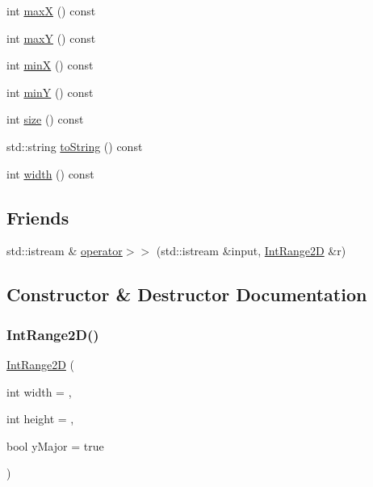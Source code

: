 \begin{DoxyCompactItemize}
\item 
int \mbox{\hyperlink{classIntRange2D_aa9493e60175cb4e130ae4cfba2b55907}{maxX}} () const
\item 
int \mbox{\hyperlink{classIntRange2D_a015dcf4989cbafff40d5a345b9d9f959}{maxY}} () const
\item 
int \mbox{\hyperlink{classIntRange2D_a1a1724b4b31e3d3d251e5816c7d9e448}{minX}} () const
\item 
int \mbox{\hyperlink{classIntRange2D_a2337641dec44ff553785d9c143c3aafd}{minY}} () const
\item 
int \mbox{\hyperlink{classIntRange2D_af9593d4a5ff4274efaf429cb4f9e57cc}{size}} () const
\item 
std\+::string \mbox{\hyperlink{classIntRange2D_a1fe5121d6528fdea3f243321b3fa3a49}{to\+String}} () const
\item 
int \mbox{\hyperlink{classIntRange2D_ad72663daf610f2a0833a2fc3d78e4fdf}{width}} () const
\end{DoxyCompactItemize}
\subsection*{Friends}
\begin{DoxyCompactItemize}
\item 
std\+::istream \& \mbox{\hyperlink{classIntRange2D_a1785cf1b9660abbc492b9fcabe2f7af5}{operator$>$$>$}} (std\+::istream \&input, \mbox{\hyperlink{classIntRange2D}{Int\+Range2D}} \&r)
\end{DoxyCompactItemize}


\subsection{Constructor \& Destructor Documentation}
\mbox{\label{classIntRange2D_a39f2016ab50300a0d0e76d60fe958356}} 
\subsubsection{\texorpdfstring{Int\+Range2\+D()}{IntRange2D()}\hspace{0.1cm}{\footnotesize\ttfamily [1/2]}}
{\footnotesize\ttfamily \mbox{\hyperlink{classIntRange2D}{Int\+Range2D}} (\begin{DoxyParamCaption}\item[{int}]{width = {},  }\item[{int}]{height = {},  }\item[{bool}]{y\+Major = {\ttfamily true} }\end{DoxyParamCaption})}

